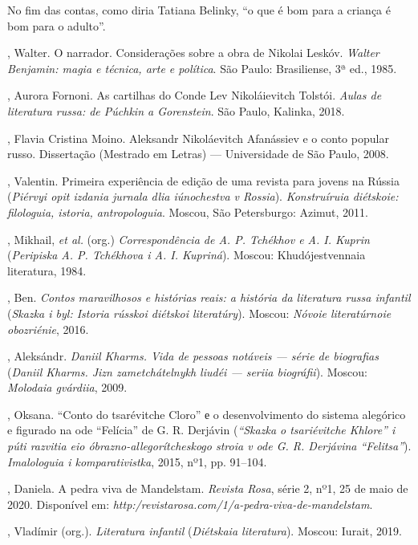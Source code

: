 No fim das contas, como diria Tatiana Belinky, ``o que é bom para a
criança é bom para o adulto''.

\begin{bibliohedra}

, Walter. O narrador. Considerações sobre a obra de Nikolai Leskóv. \textit{Walter Benjamin: magia e técnica, arte e política}. São Paulo: Brasiliense, 3ª ed., 1985.

, Aurora Fornoni. As cartilhas do Conde Lev Nikoláievitch Tolstói. \textit{Aulas de literatura russa: de Púchkin a Gorenstein}. São Paulo, Kalinka, 2018.

, Flavia Cristina Moino. Aleksandr Nikoláevitch Afanássiev e o conto popular russo. Dissertação (Mestrado em Letras) — Universidade de São Paulo, 2008.

, Valentin. Primeira experiência de edição de uma revista para jovens na Rússia (\textit{Piérvyi opit izdania jurnala dlia iúnochestva v Rossia}). \textit{Konstruíruia diétskoie: filologuia, istoria, antropologuia}. Moscou, São Petersburgo: Azimut, 2011.

, Mikhail, \textit{et al.} (org.) \textit{Correspondência de A. P. Tchékhov e A. I. Kuprin} (\textit{Peripiska A. P. Tchékhova i A. I. Kupriná}). Moscou: Khudójestvennaia literatura, 1984.

, Ben. \textit{Contos maravilhosos e histórias reais: a história da literatura russa infantil} (\textit{Skazka i byl: Istoria rússkoi diétskoi literatúry}). Moscou: \textit{Nóvoie literatúrnoie obozriénie}, 2016.

, Aleksándr. \textit{Daniil Kharms. Vida de pessoas notáveis — série de biografias} (\textit{Daniil Kharms. Jizn zametchátelnykh liudéi — seriia biográfii}). Moscou: \textit{Molodaia gvárdiia}, 2009.

, Oksana. “Conto do tsarévitche Cloro” е o desenvolvimento do sistema alegórico e figurado na ode “Felícia” de G. R. Derjávin (\textit{“Skazka o tsariévitche Khlore” i púti razvitia eio óbrazno-allegorítcheskogo stroia v ode G. R. Derjávina “Felitsa”}). \textit{Imalologuia i komparativistka}, 2015, nº1, pp. 91–104.

, Daniela. A pedra viva de Mandelstam. \textit{Revista Rosa}, série 2, nº1, 25 de maio de 2020. Disponível em: \textit{http:/revistarosa.com/1/a-pedra-viva-de-mandelstam}.

, Vladímir (org.). \textit{Literatura infantil} (\textit{Diétskaia literatura}). Moscou: Iurait, 2019.


\end{bibliohedra}
